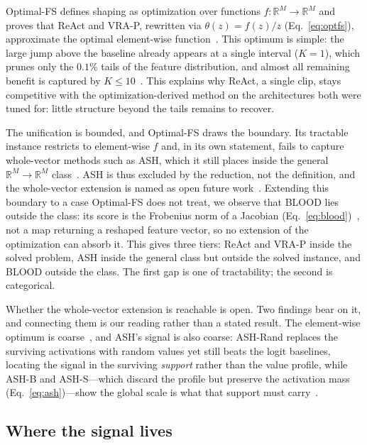 \documentclass[a4paper]{article}
\begin{document}
Optimal-FS defines shaping as optimization over functions
$f : \mathbb{R}^{M} \to \mathbb{R}^{M}$ and proves that ReAct and VRA-P, rewritten via
$\theta(z) = f(z)/z$ (Eq.~\ref{eq:optfs}), approximate the optimal element-wise
function~\citep{optimalfs}.
This optimum is simple: the large jump above the baseline already appears at a
single interval ($K=1$), which prunes only the $0.1\%$ tails of the feature
distribution, and almost all remaining benefit is captured by $K \leq
10$~\citep{optimalfs}. This explains why ReAct, a single clip, stays competitive
with the optimization-derived method on the architectures both were tuned for:
little structure beyond the tails remains to recover.

The unification is bounded, and Optimal-FS draws the boundary. Its tractable instance
restricts to element-wise $f$ and, in its own statement, fails to capture whole-vector
methods such as ASH, which it still places inside the general
$\mathbb{R}^{M} \to \mathbb{R}^{M}$ class~\citep{optimalfs}. ASH is thus excluded by the
reduction, not the definition, and the whole-vector extension is named as open future
work~\citep{optimalfs}. Extending this boundary to a case Optimal-FS does not treat, we
observe that BLOOD lies outside the class: its score is the Frobenius norm of a
Jacobian (Eq.~\ref{eq:blood})~\citep{blood}, not a map returning a reshaped feature
vector, so no extension of
the optimization can absorb it. This gives three tiers: ReAct and VRA-P inside the solved
problem, ASH inside the general class but outside the solved instance, and BLOOD outside
the class. The first gap is one of tractability; the second is categorical.

Whether the whole-vector extension is reachable is open. Two findings bear on it, and
connecting them is our reading rather than a stated result. The element-wise optimum is coarse~\citep{optimalfs}, and ASH's signal is also
coarse: ASH-Rand replaces the surviving activations with random values yet still
beats the logit baselines, locating the signal in the surviving \emph{support}
rather than the value profile, while ASH-B and ASH-S---which discard the profile
but preserve the activation mass (Eq.~\ref{eq:ash})---show the global scale is what that support
must carry~\citep{ash}.

\subsection{Where the signal lives}
\label{subsec:disc-carrier}
 
\end{document}
